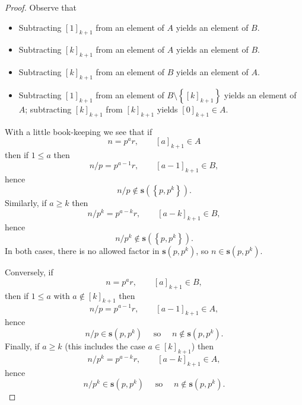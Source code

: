 \documentclass[10pt,a4paper]{amsart}
\newcommand{\set}[1]{\left\{{#1}\right\}}
\newcommand{\ssift}[1]{\mathbf{s}({#1})}
\begin{document}
\begin{proof}
Observe that
\begin{itemize}[label={\(\star\)}]
\item Subtracting \([1]_{k+1}\) from an element of \(A\) yields an element of \(B\).
\item Subtracting \([k]_{{k+1}}\) from an element of \(A\) yields an element of \(B\).
\item Subtracting \([k]_{k+1}\) from an element of \(B\) yields an element of \(A\).
\item Subtracting \([1]_{k+1}\) from an element of \(B \setminus \set{[k]_{k+1}}\) yields an element of \(A\);
subtracting \([k]_{k+1}\) from \([k]_{k+1}\) yields \([0]_{k+1} \in A\).
\end{itemize}

With a little book-keeping we see that if
\[n=p^{a}r, \qquad [a]_{k+1} \in A\]
then if \(1 \le a\) then
\[n/p = p^{a-1}r, \qquad  [a-1]_{k+1} \in B,\]
hence
\[n/p \not \in \ssift{\set{p,p^{k}}}.\]
Similarly,  if
\(a \ge k\) then
\[n/p^{k} = p^{a-k}r, \qquad [a-k]_{k+1} \in B,\]
hence
\[n/p^{k} \not \in \ssift{\set{p,p^{k}}}.\]
In both cases, there is no allowed factor in \(\ssift{p,p^{k}}\), so
\(n \in \ssift{p,p^{k}}\).

Conversely,
if \[n=p^{a}r,\qquad [a]_{k+1} \in B,\] then
if \(1 \le a\) with \(a \not \in [k]_{k+1}\) then
\[n/p = p^{a-1}r,\qquad [a-1]_{k+1} \in A,\]
hence
\[n/p  \in \ssift{p,p^{k}} \quad  \text{ so } \quad n  \not \in \ssift{p,p^{k}}.\]
Finally, if \(a \ge k\) (this includes the case \(a  \in [k]_{k+1}\))
then \[n/p^{k} = p^{a-k}r,\qquad [a-k]_{k+1} \in A,\] hence
\[n/p^{k} \in \ssift{p,p^{k}} \quad \text{ so } \quad n  \not \in \ssift{p,p^{k}}.\]
\end{proof}
\end{document}
